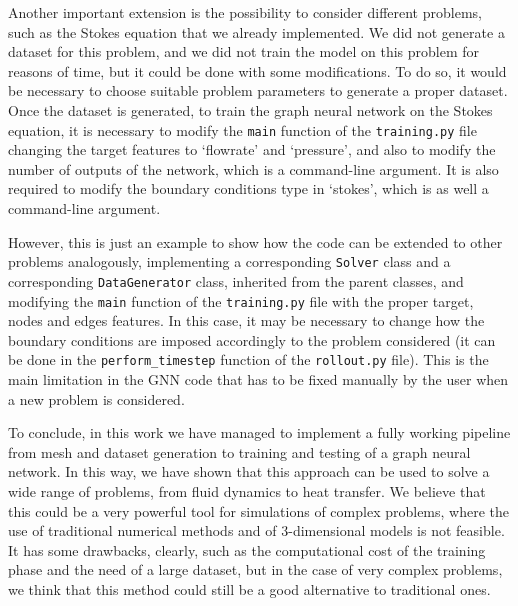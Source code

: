 \documentclass[11pt,a4paper]{article}
\begin{document}
Another important extension is the possibility to consider different problems, such as the Stokes equation that we already implemented. We did not generate a dataset for this problem, and we did not train the model on this problem for reasons of time, but it could be done with some modifications. To do so, it would be necessary to choose suitable problem parameters to generate a proper dataset. 
Once the dataset is generated, to train the graph neural network on the Stokes equation, it is necessary to modify the \texttt{main} function of the \texttt{training.py} file changing the target features to `flowrate' and `pressure', and also to modify the number of outputs of the network, which is a command-line argument. It is also required to modify the boundary conditions type in `stokes', which is as well a command-line argument.

However, this is just an example to show how the code can be extended to other problems analogously, implementing a corresponding \texttt{Solver} class and a corresponding \texttt{DataGenerator} class, inherited from the parent classes, and modifying the \texttt{main} function of the \texttt{training.py} file with the proper target, nodes and edges features. In this case, it may be necessary to change how the boundary conditions are imposed accordingly to the problem considered (it can be done in the \texttt{perform\_timestep} function of the \texttt{rollout.py} file). This is the main limitation in the GNN code that has to be fixed manually by the user when a new problem is considered. 

To conclude, in this work we have managed to implement a fully working pipeline from mesh and dataset generation to training and testing of a graph neural network. In this way, we have shown that this approach can be used to solve a wide range of problems, from fluid dynamics to heat transfer. We believe that this could be a very powerful tool for simulations of complex problems, where the use of traditional numerical methods and of 3-dimensional models is not feasible. It has some drawbacks, clearly, such as the computational cost of the training phase and the need of a large dataset, but in the case of very complex problems, we think that this method could still be a good alternative to traditional ones.


\newpage
\end{document}
